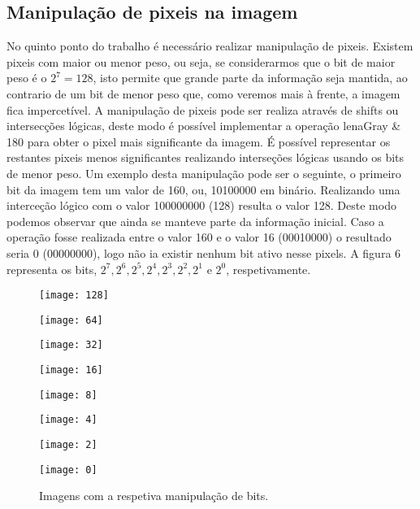 \documentclass[12pt,a4paper]{article}
\begin{document}
\subsection{Manipulação de pixeis na imagem}
No quinto ponto do trabalho é necessário realizar manipulação de pixeis. Existem pixeis com maior ou menor peso, ou seja, se considerarmos que o bit de maior peso é o $2^7 = 128$, isto permite que grande parte da informação seja mantida, ao contrario de um bit de menor peso que, como veremos mais à frente, a imagem fica impercetível. A manipulação de pixeis pode ser realiza através de shifts ou intersecções lógicas, deste modo é possível implementar a operação lenaGray \& 180 para obter o pixel mais significante da imagem. É possível representar os restantes pixeis menos significantes realizando interseções  lógicas usando os bits de menor peso. Um exemplo desta manipulação pode ser o seguinte, o primeiro bit da imagem tem um valor de 160, ou, 10100000 em binário. Realizando uma interceção lógico com o valor 100000000 (128) resulta o valor 128. Deste modo podemos observar que ainda se manteve parte da informação inicial. Caso a operação fosse realizada entre o valor 160 e o valor 16 (00010000) o resultado seria 0 (00000000), logo não ia existir nenhum bit ativo nesse pixels. A figura 6 representa os bits, $2^7, 2^6, 2^5, 2^4, 2^3, 2^2, 2^1$ e $2^0$, respetivamente.

\clearpage

\begin{figure}[h] 
\centering
  \begin{minipage}{0.4\linewidth}
    \centering
    \texttt{[image: 128]} 
  \end{minipage}
  \begin{minipage}{0.4\linewidth}
    \centering
    \texttt{[image: 64]} 
  \end{minipage} 
  \begin{minipage}{0.4\linewidth}
    \centering
    \texttt{[image: 32]} 
  \end{minipage} 
  \begin{minipage}{0.4\linewidth}
    \centering
    \texttt{[image: 16]} 
  \end{minipage}
  \begin{minipage}{0.4\linewidth}
    \centering
    \texttt{[image: 8]} 
  \end{minipage}
  \begin{minipage}{0.4\linewidth}
    \centering
    \texttt{[image: 4]} 
  \end{minipage} 
  \begin{minipage}{0.4\linewidth}
    \centering
    \texttt{[image: 2]} 
  \end{minipage} 
  \begin{minipage}{0.4\linewidth}
    \centering
    \texttt{[image: 0]} 
  \end{minipage}
  \caption{Imagens com a respetiva manipulação de bits.}
\end{figure}
\end{document}
